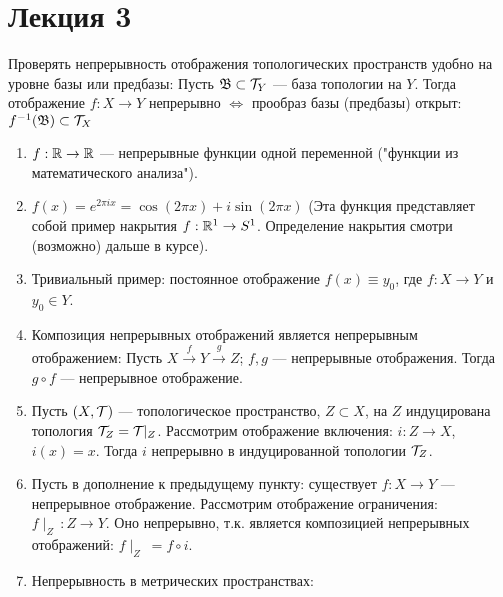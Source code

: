 \section{Лекция 3}


\begin{nota_bene}
    Проверять непрерывность отображения топологических пространств удобно на уровне базы или предбазы:
    Пусть $\mathfrak{B} \subset \mathcal{T}_{Y}$ --- база топологии на $Y$.
    Тогда отображение $f: X \rightarrow Y$ непрерывно $\Leftrightarrow$ прообраз базы (предбазы) открыт: $f^{-1}(\mathfrak{B}) \subset \mathcal{T}_{X}$
\end{nota_bene}

\begin{example} %
    \begin{enumerate}
        \item $f: \mathbb{R} \rightarrow \mathbb{R}$ --- непрерывные функции одной переменной ("функции из математического анализа").
        \item $f(x) = e^{2 \pi i x} = \cos (2\pi x) + i \sin (2\pi x)$ (Эта функция представляет собой пример накрытия $f: \mathbb{R}^1 \rightarrow S^1$. Определение накрытия смотри (возможно) дальше в курсе). %
        \item Тривиальный пример: постоянное отображение $f(x) \equiv  y_0$, где $f: X \rightarrow Y$ и $y_0 \in Y$.
        \item Композиция непрерывных отображений является непрерывным отображением: Пусть $X \overset{f}{\rightarrow} Y \overset{g}{\rightarrow} Z$; $f, g$ --- непрерывные отображения. Тогда $g \circ f$ --- непрерывное отображение.
        \item Пусть $(X, \mathcal{T})$ --- топологическое пространство, $Z \subset X$, на $Z$ индуцирована топология $\mathcal{T}_{Z} = \mathcal{T} \!\! \mid_{Z}$. Рассмотрим отображение включения: $i: Z \rightarrow X$, $i(x) = x$. Тогда $i$ непрерывно в индуцированной топологии $\mathcal{T}_{Z}$.
        \item Пусть в дополнение к предыдущему пункту: существует $f: X \rightarrow Y$ --- непрерывное отображение. Рассмотрим отображение ограничения: $f \! \mid_{Z} \, : Z \rightarrow Y$. Оно непрерывно, т.к. является композицией непрерывных отображений: $f \! \mid_{Z} \ = f \circ i$.
        \item Непрерывность в метрических пространствах:
    \end{enumerate}
\end{example}

